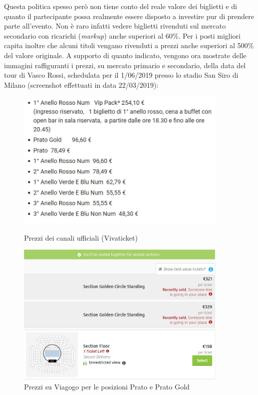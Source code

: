 Questa politica spesso però non tiene conto del reale valore dei biglietti e di quanto il partecipante possa realmente essere disposto a investire pur di prendere parte all'evento. Non è raro infatti vedere biglietti rivenduti sul mercato secondario con ricarichi (\textit{markup}) anche superiori al 60\%. Per i posti migliori capita inoltre che alcuni titoli vengano rivenduti a prezzi anche superiori al 500\% del valore originale. A supporto di quanto indicato, vengono ora mostrate delle immagini raffiguranti i prezzi, su mercato primario e secondario, della data del tour di Vasco Rossi, schedulata per il 1/06/2019 presso lo stadio San Siro di Milano (screenshot effettuati in data 22/03/2019): 
\begin{figure}[H]
    \centering
    \begin{minipage}{0.45\textwidth}
        \centering
        \includegraphics[width=0.9\textwidth]{chapter2/immagini/vascofv} %
        \caption{Prezzi dei canali ufficiali (Vivaticket)}
    \end{minipage}\hfill
    \begin{minipage}{0.45\textwidth}
        \centering
        \includegraphics[width=0.9\textwidth]{chapter2/immagini/vascost} %
        \caption{Prezzi su Viagogo per le posizioni Prato e Prato Gold}
    \end{minipage}
\end{figure}

